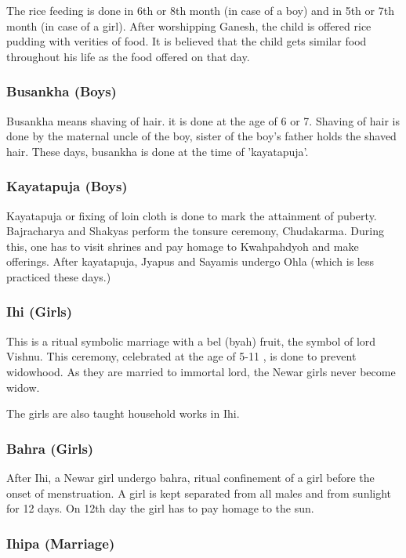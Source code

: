 \documentclass[a4paper,13pt, margin=0.9in]{article}
\begin{document}
\begin{flushleft}
The rice feeding is done in 6th or 8th month (in case of a boy) and in 5th or 7th month (in case of a girl). After worshipping Ganesh, the child is offered rice pudding with verities of food. It is believed that the child gets similar food throughout his life as the food offered on that day.

\subsubsection{Busankha (Boys)}

Busankha means shaving of hair. it is done at the age of 6 or 7. Shaving of hair is done by the maternal uncle of the boy, sister of the boy's father holds the shaved hair. These days, busankha is done at the time of 'kayatapuja'.

\subsubsection{Kayatapuja (Boys)}

Kayatapuja or fixing of loin cloth is done to mark the attainment of puberty. Bajracharya and Shakyas perform the tonsure ceremony, Chudakarma. During this, one has to visit shrines and pay homage to Kwahpahdyoh and make offerings. After kayatapuja, Jyapus and Sayamis undergo Ohla (which is less practiced these days.)

\subsubsection{Ihi (Girls)}

This is a ritual symbolic marriage with a bel (byah) fruit, the symbol of lord Vishnu. This ceremony, celebrated at the age of 5-11 , is done to prevent widowhood. As they are married to immortal lord, the Newar girls never become widow.

The girls are also taught household works in Ihi.

\subsubsection{Bahra (Girls)}

After Ihi, a Newar girl undergo bahra, ritual confinement of a girl before the onset of menstruation. A girl is kept separated from all males and from sunlight for 12 days. On 12th day the girl has to pay homage to the sun.

\subsubsection{Ihipa (Marriage)}


\end{flushleft}
\end{document}
